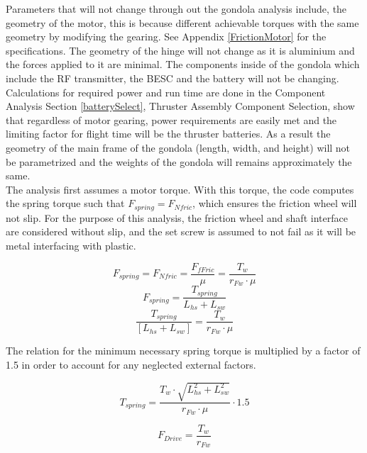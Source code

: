 \documentclass[../main.tex]{subfiles}
\begin{document}
Parameters that will not change through out the gondola analysis include, the geometry of the motor, this is because different achievable torques with the same geometry by modifying the gearing. See Appendix \ref{FrictionMotor} for the specifications. The geometry of the hinge will not change as it is aluminium and the forces applied to it are minimal. The components inside of the gondola which include the RF transmitter, the BESC and the battery will not be changing. Calculations for required power and run time are done in the Component Analysis Section \ref{batterySelect}, Thruster Assembly Component Selection, show that regardless of motor gearing, power requirements are easily met and the limiting factor for flight time will be the thruster batteries. As a result the geometry of the main frame of the gondola (length, width, and height) will not be parametrized and the weights of the gondola will remains approximately the same. \\

The analysis first assumes a motor torque. With this torque, the code computes the spring torque such that $F_{spring} = F_{Nfric}$, which ensures the friction wheel will not slip. For the purpose of this analysis, the friction wheel and shaft interface are considered without slip, and the set screw is assumed to not fail as it will be metal interfacing with plastic.

\begin{equation}
F_{spring} = F_{Nfric} = \frac{F_{fFric}}{\mu} = \frac{T_w}{r_{Fw}\cdot{}\mu}
\end{equation}
\begin{equation}
\label{eqn:springForce}
F_{spring} = \frac{T_{spring}}{L_{hs}+L_{sw}}
\end{equation}
\begin{equation}
\frac{T_{spring}}{[L_{hs}+L_{sw}]} = \frac{T_w}{r_{Fw}\cdot{}\mu}
\end{equation}

The relation for the minimum necessary spring torque is multiplied by a factor of 1.5 in order to account for any neglected external factors.

\begin{equation}
\label{eqn:springTorque}
T_{spring} = \frac{T_w\cdot{\sqrt{L_{hs}^2+L_{sw}^2}}}{r_{Fw}\cdot{}\mu}\cdot{1.5}
\end{equation}

\begin{equation}
\label{eqn:driveForce}
F_{Drive} = \frac{T_w}{r_{Fw}}
\end{equation}
\end{document}
